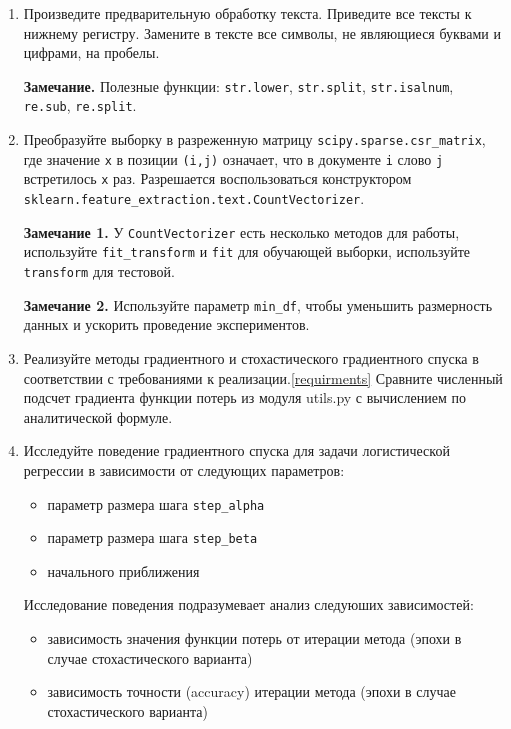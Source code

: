 \documentclass[10pt,fleqn]{article}
\begin{document}
\begin{enumerate}
    \item Произведите предварительную обработку текста. Приведите все тексты к нижнему регистру. Замените в тексте все символы, не являющиеся буквами и цифрами, на пробелы.

    \textbf{Замечание.}
    Полезные функции: \verb|str.lower|,  \verb|str.split|, \verb|str.isalnum|, \verb|re.sub|, \verb|re.split|.

    \item Преобразуйте выборку в разреженную матрицу \verb|scipy.sparse.csr_matrix|, где значение \verb|x| в позиции \verb|(i,j)| означает, что в документе \verb|i| слово \verb|j| встретилось \verb|x| раз.
    Разрешается воспользоваться конструктором  \verb|sklearn.feature_extraction.text.CountVectorizer|.

    \textbf{Замечание 1.} У \verb|CountVectorizer| есть несколько методов для работы, используйте \texttt{fit\_transform} и \texttt{fit} для обучающей выборки, используйте \texttt{transform} для тестовой.

    \textbf{Замечание 2.} Используйте параметр \texttt{min\_df}, чтобы уменьшить размерность данных и ускорить проведение экспериментов.

    \item Реализуйте методы градиентного и стохастического градиентного спуска в соответствии с требованиями к реализации.\ref{requirments} Сравните численный подсчет градиента функции потерь из модуля utils.py с вычислением по аналитической формуле.
    
    \item Исследуйте поведение градиентного спуска для задачи логистической регрессии в зависимости от следующих параметров:
    \begin{itemize}
        \item параметр размера шага \texttt{step\_alpha}
        \item параметр размера шага \texttt{step\_beta}
        \item начального приближения
    \end{itemize}

    Исследование поведения подразумевает анализ следуюших зависимостей:
    \begin{itemize}
        \item зависимость значения функции потерь от итерации метода (эпохи в случае стохастического варианта)

        \item зависимость точности (accuracy) итерации метода (эпохи в случае стохастического варианта)
        

\end{itemize}
\end{enumerate}
\end{document}
